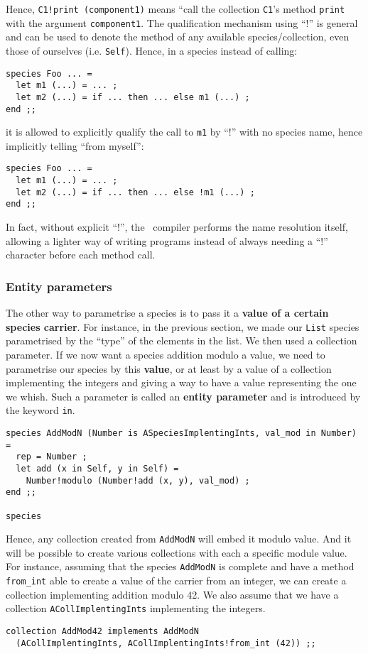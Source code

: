 Hence, {\tt C1!print (component1)} means ``call the collection
{\tt C1}'s method {\tt print} with the argument {\tt component1}. The
qualification mechanism using ``!'' is general and can be used to
denote the method of any available species/collection, even those of
ourselves (i.e. {\tt Self}). Hence, in a species instead of calling:
{\scriptsize
\begin{lstlisting}
species Foo ... =
  let m1 (...) = ... ;
  let m2 (...) = if ... then ... else m1 (...) ;
end ;;
\end{lstlisting}
}
it is allowed to explicitly qualify the call to {\tt m1} by ``!''
with no species name, hence implicitly telling ``from myself'':
{\scriptsize
\begin{lstlisting}
species Foo ... =
  let m1 (...) = ... ;
  let m2 (...) = if ... then ... else !m1 (...) ;
end ;;
\end{lstlisting}
}
In fact, without explicit ``!'', the \focal\ compiler performs the
name resolution itself, allowing a lighter way of writing programs
instead of always needing a ``!'' character before each method call.



\subsubsection{Entity parameters}
\label{entity-parameter}
The other way to parametrise a species is to pass it a
{\bf value of a certain species carrier}. For instance, in the
previous section, we made our {\tt List} species parametrised by the
``type'' of the elements in the list. We then used a collection
parameter. If we now want a species addition modulo a value, we need
to parametrise our species by this {\bf value}, or at least by a
value of a collection implementing the integers and giving a way to
have a value representing the one we whish. Such a parameter is called
an {\bf entity parameter} and is introduced by the keyword {\tt in}.
{\scriptsize
\begin{lstlisting}
species AddModN (Number is ASpeciesImplentingInts, val_mod in Number) =
  rep = Number ;
  let add (x in Self, y in Self) =
    Number!modulo (Number!add (x, y), val_mod) ;
end ;;

species
\end{lstlisting}
}

Hence, any collection created from {\tt AddModN} will embed it modulo
value. And it will be possible to create various collections with each
a specific module value. For instance, assuming that the species
{\tt AddModN} is complete and have a method {\tt from\_int} able to
create a value of the carrier from an integer, we can create a
collection implementing addition modulo 42. We also assume that we
have a collection {\tt ACollImplentingInts} implementing the
integers.
{\scriptsize
\begin{lstlisting}
collection AddMod42 implements AddModN
  (ACollImplentingInts, ACollImplentingInts!from_int (42)) ;;
\end{lstlisting}
}


